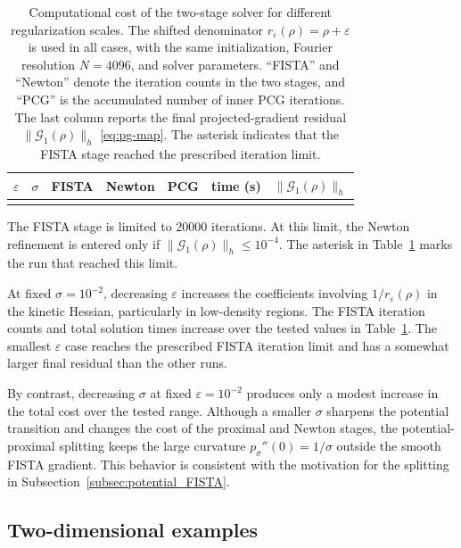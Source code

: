 \documentclass[11pt]{article}
\newcommand{\eps}{\varepsilon}
\newcommand{\sig}{\sigma}
\theoremstyle{plain}
\theoremstyle{definition}
\numberwithin{equation}{section}
\begin{document}
\begin{table}[H]
\centering
\caption{
Computational cost of the two-stage solver for different
regularization scales. The shifted denominator
$r_\eps(\rho)=\rho+\eps$ is used in all cases, with the same
initialization, Fourier resolution $N=4096$, and solver parameters.
``FISTA'' and ``Newton'' denote the iteration counts in the two
stages, and ``PCG'' is the accumulated number of inner PCG
iterations. The last column reports the final projected-gradient
residual $\|\mathcal G_1(\rho)\|_h$ \eqref{eq:pg-map}. The asterisk
indicates that the FISTA stage reached the prescribed iteration limit.
}
\label{tab:solver-regularization-cost}
\begin{tabular}{ccccccc}
\toprule
$\eps$ & $\sig$
& FISTA & Newton & PCG
& time (s) & $\|\mathcal G_1(\rho)\|_h$ \\
\midrule
\\
\bottomrule
\end{tabular}
\end{table}

The FISTA stage is limited to $20000$ iterations. At this limit,
the Newton refinement is entered only if
$\|\mathcal G_1(\rho)\|_h\le10^{-4}$. The asterisk in
Table~\ref{tab:solver-regularization-cost} marks the run that reached
this limit.

At fixed $\sig=10^{-2}$, decreasing $\eps$ increases the coefficients
involving $1/r_\eps(\rho)$ in the kinetic Hessian, particularly in
low-density regions. The FISTA iteration counts and total solution
times increase over the tested values in
Table~\ref{tab:solver-regularization-cost}. The smallest $\eps$ case
reaches the prescribed FISTA iteration limit and has a somewhat larger
final residual than the other runs.

By contrast, decreasing $\sig$ at fixed $\eps=10^{-2}$ produces only
a modest increase in the total cost over the tested range. Although a
smaller $\sig$ sharpens the potential transition and changes the cost
of the proximal and Newton stages, the
potential-proximal splitting keeps the large curvature
$p_\sig''(0)=1/\sig$ outside the smooth FISTA gradient. This behavior
is consistent with the motivation for the splitting in
Subsection~\ref{subsec:potential_FISTA}.


\subsection{Two-dimensional examples}
\label{subsec:num-2d}
\end{document}
